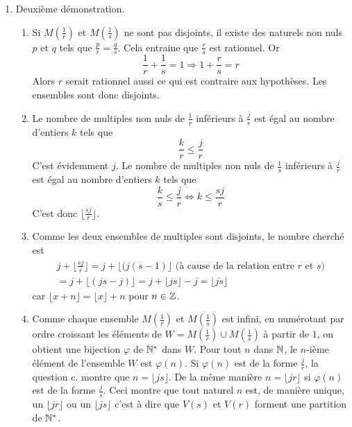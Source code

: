 \begin{enumerate}
\item Deuxième démonstration.
\begin{enumerate}
 \item Si $M(\frac{1}{r})$ et $M(\frac{1}{s})$ ne sont pas disjoints, il existe des naturels non nuls $p$ et $q$ tels que $\frac{p}{r}=\frac{q}{s}$. Cela entraine que $\frac{r}{s}$ est rationnel. Or
\begin{displaymath}
 \frac{1}{r}+\frac{1}{s}=1 \Rightarrow 1+\frac{r}{s}=r
\end{displaymath}
 Alors $r$ serait rationnel aussi ce qui est contraire aux hypothèses. Les ensembles sont donc disjoints.
 \item Le nombre de multiples non nuls de $\frac{1}{r}$ inférieurs à $\frac{j}{r}$ est égal au nombre d'entiers $k$ tels que
\begin{displaymath}
 \frac{k}{r}\leq \frac{j}{r}
\end{displaymath}
C'est évidemment $j$.\newline
Le nombre de multiples non nuls de $\frac{1}{s}$ inférieurs à $\frac{j}{r}$ est égal au nombre d'entiers $k$ tels que
\begin{displaymath}
 \frac{k}{s}\leq \frac{j}{r} \Leftrightarrow k \leq \frac{sj}{r}
\end{displaymath}
C'est donc $\lfloor \frac{sj}{r} \rfloor$.
 \item Comme les deux ensembles de multiples sont disjoints, le nombre cherché est
\begin{multline*}
 j + \lfloor \frac{sj}{r} \rfloor 
= j + \lfloor (j(s-1) \rfloor \text{ (à cause de la relation entre $r$ et $s$)}\\
= j + \lfloor (js-j) \rfloor= j + \lfloor js \rfloor -j = \lfloor js \rfloor
\end{multline*}
car $\lfloor x + n\rfloor = \lfloor x\rfloor + n$ pour $n\in \mathbb{Z}$.
 \item Comme chaque ensemble $M(\frac{1}{r})$ et $M(\frac{1}{s})$ est infini, en numérotant par ordre croissant les éléments de $W = M(\frac{1}{r})\cup M(\frac{1}{s})$ à partir de $1$, on obtient une bijection $\varphi$ de $\mathbb{N}^*$ dans $W$.\newline
 Pour tout $n$ dans $\mathbb{N}$, le $n$-ième élément de l'ensemble $W$ est $\varphi(n)$. Si $\varphi(n)$ est de la forme $\frac{j}{r}$, la question c. montre que $n= \lfloor js \rfloor$. De la même manière $n= \lfloor jr \rfloor$ si $\varphi(n)$ est de la forme $\frac{j}{s}$. Ceci montre que tout naturel $n$ est, de manière unique, un $\lfloor jr \rfloor$ ou un $\lfloor js \rfloor$ c'est à dire que $V(s)$ et $V(r)$ forment une partition de $\mathbb{N}^*$.
\end{enumerate}
\end{enumerate}

